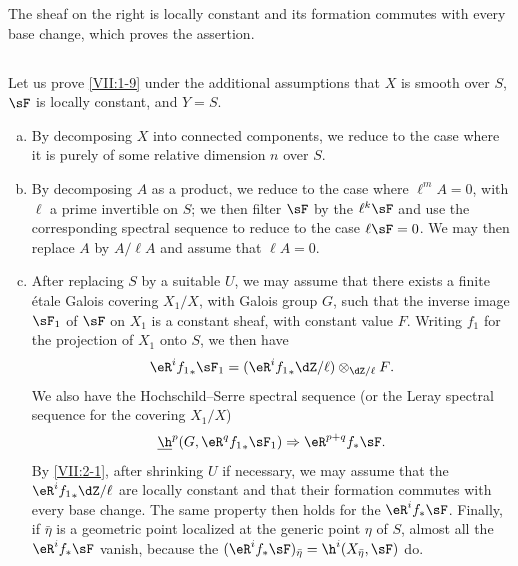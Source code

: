 \documentclass[oneside]{book}
\begin{document}
The sheaf on the right is locally constant and its formation commutes with
every base change, which proves the assertion.





\subsection{}\label{VII:2-2}

Let us prove \ref{VII:1-9} under the additional assumptions that $X$ is smooth
over $S$, $\sF$ is locally constant, and $Y=S$.
\begin{enumerate}[a)]
  \item By decomposing $X$ into connected components, we reduce to the case
    where it is purely of some relative dimension $n$ over $S$.
  \item By decomposing $A$ as a product, we reduce to the case where
    $\ell^m A=0$, with $\ell$ a prime invertible on $S$; we then filter $\sF$
    by the $\ell^k \sF$ and use the corresponding spectral sequence to reduce
    to the case $\ell\sF=0$. We may then replace $A$ by $A/\ell A$ and assume
    that $\ell A=0$.
  \item After replacing $S$ by a suitable $U$, we may assume that there exists
    a finite étale Galois covering $X_1/X$, with Galois group $G$, such that
    the inverse image $\sF_1$ of $\sF$ on $X_1$ is a constant sheaf, with
    constant value $F$. Writing $f_1$ for the projection of $X_1$ onto $S$,
    we then have
    \[
      \eR^i {f_1}_\ast \sF_1 = (\eR^i {f_1}_\ast \dZ/\ell)\otimes_{\dZ/\ell} F \text{.} 
    \]
    We also have the Hochschild--Serre spectral sequence (or the Leray
    spectral sequence for the covering $X_1/X$)
    \[
      \underline\h^p(G,\eR^q {f_1}_\ast \sF_1) \Rightarrow \eR^{p+q} f_\ast \sF \text{.} 
    \]
    By \ref{VII:2-1}, after shrinking $U$ if necessary, we may assume that
    the $\eR^i {f_1}_\ast \dZ/\ell$ are locally constant and that their
    formation commutes with every base change. The same property then holds
    for the $\eR^i f_\ast \sF$. Finally, if $\bar\eta$ is a geometric point
    localized at the generic point $\eta$ of $S$, almost all the
    $\eR^i f_\ast\sF$ vanish, because the
    $(\eR^i f_\ast \sF)_{\bar\eta} = \h^i(X_{\bar \eta},\sF)$ do.
\end{enumerate}





\subsection{}\label{VII:2-3}
\end{document}
